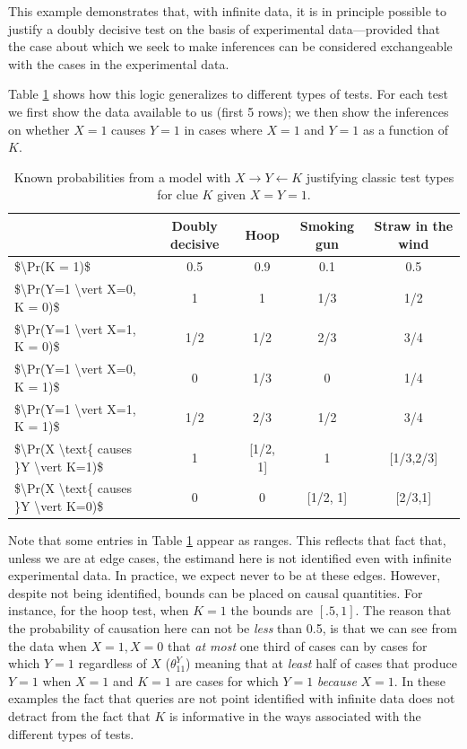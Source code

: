 \documentclass[
  12pt,
]{book}
\begin{document}
This example demonstrates that, with infinite data, it is in principle possible to justify a doubly decisive test on the basis of experimental data---provided that the case about which we seek to make inferences can be considered exchangeable with the cases in the experimental data.

Table \ref{tab:tests15} shows how this logic generalizes to different types of tests. For each test we first show the data available to us (first 5 rows); we then show the inferences on whether \(X=1\) causes \(Y=1\) in cases where \(X=1\) and \(Y=1\) as a function of \(K\).

\begin{table}

\caption{\label{tab:tests15}Known probabilities from a model with  $X \rightarrow Y \leftarrow K$  justifying classic test types for clue $K$ given $X=Y=1$.}
\centering
\begin{tabular}[t]{l|c|c|c|c}
\hline
 & Doubly decisive & Hoop & Smoking gun & Straw in the wind\\
\hline
\$\textbackslash{}Pr(K = 1)\$ & 0.5 & 0.9 & 0.1 & 0.5\\
\hline
\$\textbackslash{}Pr(Y=1 \textbackslash{}vert X=0, K = 0)\$ & 1 & 1 & 1/3 & 1/2\\
\hline
\$\textbackslash{}Pr(Y=1 \textbackslash{}vert X=1, K = 0)\$ & 1/2 & 1/2 & 2/3 & 3/4\\
\hline
\$\textbackslash{}Pr(Y=1 \textbackslash{}vert X=0, K = 1)\$ & 0 & 1/3 & 0 & 1/4\\
\hline
\$\textbackslash{}Pr(Y=1 \textbackslash{}vert X=1, K = 1)\$ & 1/2 & 2/3 & 1/2 & 3/4\\
\hline
\$\textbackslash{}Pr(X \textbackslash{}text\{  causes \}Y \textbackslash{}vert K=1)\$ & 1 & [1/2, 1] & 1 & [1/3,2/3]\\
\hline
\$\textbackslash{}Pr(X \textbackslash{}text\{  causes \}Y \textbackslash{}vert K=0)\$ & 0 & 0 & [1/2, 1] & [2/3,1]\\
\hline
\end{tabular}
\end{table}

Note that some entries in Table \ref{tab:tests15} appear as ranges. This reflects that fact that, unless we are at edge cases, the estimand here is not identified even with infinite experimental data. In practice, we expect never to be at these edges. However, despite not being identified, bounds can be placed on causal quantities. For instance, for the hoop test, when \(K=1\) the bounds are \([.5,1]\). The reason that the probability of causation here can not be \emph{less} than 0.5, is that we can see from the data when \(X=1, X=0\) that \emph{at most} one third of cases can by cases for which \(Y=1\) regardless of \(X\) (\(\theta^Y_{11}\)) meaning that at \emph{least} half of cases that produce \(Y=1\) when \(X=1\) and \(K=1\) are cases for which \(Y=1\) \emph{because} \(X=1\). In these examples the fact that queries are not point identified with infinite data does not detract from the fact that \(K\) is informative in the ways associated with the different types of tests.
\end{document}
